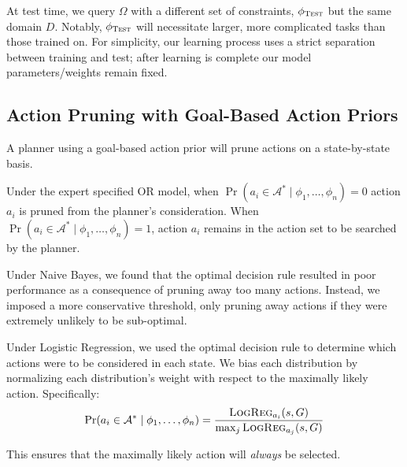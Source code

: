 \documentclass[11pt]{article}
\begin{document}

At test time, we query $\Omega$ with a different set of constraints, $\phi_{\textsc{Test}}$ but the same domain $D$. Notably, $\phi_{\textsc{Test}}$ will necessitate larger, more complicated tasks than those trained on. For simplicity, our learning process uses a strict separation between training and test; after learning is complete our model parameters/weights remain fixed.

\subsection{Action Pruning with Goal-Based Action Priors}
\label{sec:action_pruning}
A planner using a goal-based action prior will prune actions on a state-by-state basis. 

Under the expert specified OR model, when $\Pr(a_i \in \mathcal{A}^*  \mid \phi_1, \ldots, \phi_n) = 0$
action $a_i$ is pruned from the planner's consideration. When
$\Pr(a_i \in \mathcal{A}^*  \mid \phi_1, \ldots, \phi_n) = 1$,
action $a_i$ remains in the action set to be searched by the planner.

Under Naive Bayes, we found that the optimal decision rule resulted in poor performance as a consequence of pruning away too many actions. Instead, we imposed a more conservative threshold, only pruning away actions if they were extremely unlikely to be sub-optimal.

Under Logistic Regression, we used the optimal decision rule to determine which actions were to be considered in each state. We bias each distribution by normalizing each distribution's weight with respect to the maximally likely action. Specifically:
\begin{equation}
\Pr(a_i \in \mathcal{A}^*  \mid \phi_1, \ldots, \phi_n) = \frac{\textsc{LogReg}_{a_i}(s, G)}{\max_j \textsc{LogReg}_{a_j}(s, G)}
\end{equation}

This ensures that the maximally likely action will {\it always} be selected.
\end{document}
